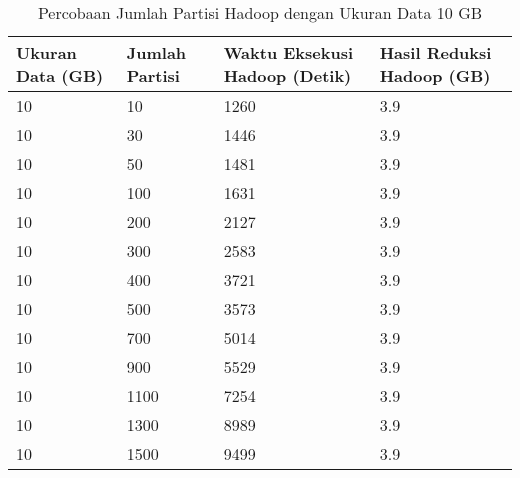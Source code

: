 \begin{table}[H] 
	\centering 
	\caption{Percobaan Jumlah Partisi Hadoop dengan Ukuran Data 10 GB}
	\label{tab:spark7}
	\begin{tabular}{|p{3cm}|p{2.5cm}|p{4cm}|p{3.5cm}|}
\hline
Ukuran Data (GB) & Jumlah Partisi &  Waktu Eksekusi Hadoop (Detik) & Hasil Reduksi Hadoop (GB)\\
\hline
10 & 10 & 1260 & 3.9 \\
\hline
10 & 30 & 1446 & 3.9 \\
\hline
10 & 50 & 1481 & 3.9 \\
\hline
10 & 100 & 1631 & 3.9 \\
\hline
10 & 200 & 2127 & 3.9 \\
\hline
10 & 300 & 2583 & 3.9 \\
\hline
10 & 400 & 3721 & 3.9 \\
\hline
10 & 500 & 3573 & 3.9 \\
\hline
10 & 700 & 5014 & 3.9 \\
\hline
10 & 900 & 5529 & 3.9 \\
\hline
10 & 1100 & 7254 & 3.9 \\
\hline
10 & 1300 & 8989 & 3.9 \\
\hline
10 & 1500 & 9499 & 3.9 \\
\hline


\hline

	\end{tabular} 
\end{table}



\def\scl{1}

\def\leg{} 
\def\std{none}
\def\ymin{}
\def\ymax{}

